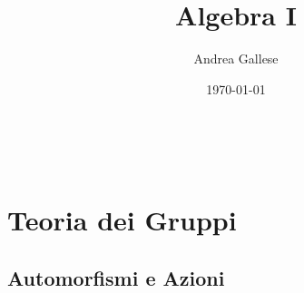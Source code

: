 \documentclass[a4paper]{article}
\title{Algebra I}\let\Title\@title
\author{Andrea Gallese}\let\Author\@author
\date{\today}\let\Date\@date
\theoremstyle{remark}
\theoremstyle{definition}
\begin{document}
\begin{center}
	\vspace*{0,5 cm}
	{\Huge \textsc{\Title}} \\
	\vspace{0,5 cm}
	\textsc{\Author} \hspace{1cm} \textsc{\Date}
	\thispagestyle{empty}
	\vspace{0,7 cm}
\end{center}
\small

\tableofcontents
\newpage

\setcounter{section}{6} %
\section{Teoria dei Gruppi}
\subsection{Automorfismi e Azioni}
\end{document}
